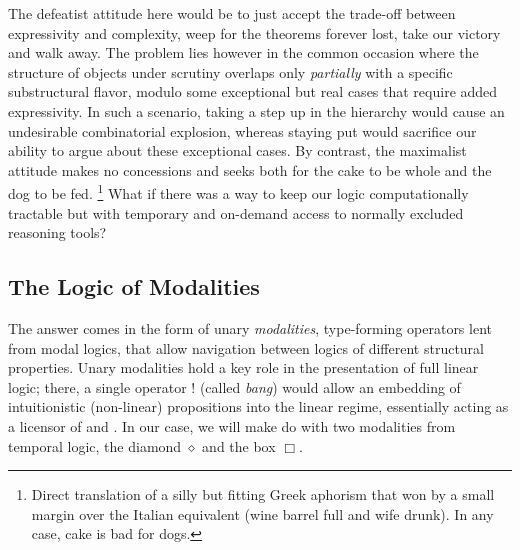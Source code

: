 The defeatist attitude here would be to just accept the trade-off between expressivity and complexity, weep for the theorems forever lost, take our victory and walk away.
The problem lies however in the common occasion where the structure of objects under scrutiny overlaps only \textit{partially} with a specific substructural flavor, modulo some exceptional but real cases that require added expressivity.
In such a scenario, taking a step up in the hierarchy would cause an undesirable combinatorial explosion, whereas staying put would sacrifice our ability to argue about these exceptional cases. 
By contrast, the maximalist attitude makes no concessions and seeks both for the cake to be whole and the dog to be fed.%
\footnote{Direct translation of a silly but fitting Greek aphorism that won by a small margin over the Italian equivalent (wine barrel full and wife drunk). In any case, cake is bad for dogs.}
What if there was a way to keep our logic computationally tractable but with temporary and on-demand access to normally excluded reasoning tools?

\subsection{The Logic of Modalities}
The answer comes in the form of unary \textit{modalities}, type-forming operators lent from modal logics, that allow navigation between logics of different structural properties.
Unary modalities hold a key role in the presentation of full linear logic; there, a single operator $!$ (called \textit{bang}) would allow an embedding of intuitionistic (non-linear) propositions into the linear regime, essentially acting as a licensor of \Contraction{} and \Weakening{}.
In our case, we will make do with two modalities from temporal logic, the diamond $\diamond$ and the box $\Box$.

